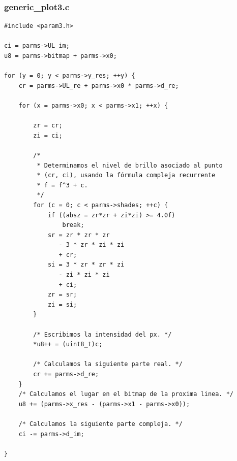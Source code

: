 \documentclass[a4paper,10pt]{article}
\begin{document}
\subsubsection{generic\_plot3.c}
\begin{verbatim}
#include <param3.h>

ci = parms->UL_im;
u8 = parms->bitmap + parms->x0;

for (y = 0; y < parms->y_res; ++y) {
	cr = parms->UL_re + parms->x0 * parms->d_re; 

	for (x = parms->x0; x < parms->x1; ++x) {
		
		zr = cr;
		zi = ci;

		/*
		 * Determinamos el nivel de brillo asociado al punto
		 * (cr, ci), usando la fórmula compleja recurrente 
		 * f = f^3 + c.
		 */
		for (c = 0; c < parms->shades; ++c) {
			if ((absz = zr*zr + zi*zi) >= 4.0f)
				break;
			sr = zr * zr * zr
			   - 3 * zr * zi * zi
			   + cr;
			si = 3 * zr * zr * zi
			   - zi * zi * zi
			   + ci;
			zr = sr;
			zi = si;
		}

		/* Escribimos la intensidad del px. */
		*u8++ = (uint8_t)c;

		/* Calculamos la siguiente parte real. */
		cr += parms->d_re;
	}
	/* Calculamos el lugar en el bitmap de la proxima linea. */
	u8 += (parms->x_res - (parms->x1 - parms->x0));

	/* Calculamos la siguiente parte compleja. */
	ci -= parms->d_im;
	
}

\end{verbatim}
\end{document}
